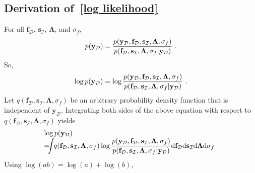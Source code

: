 \documentclass[conference]{IEEEtran}
\begin{document}
	\subsection{Derivation of~\eqref{log likelihood}}
	\label{Derivation of Equation (15)}
	For all $\mathbf{f}_\mathcal{D}$, $\mathbf{s}_\mathcal{I}$, $\mathbf{\Lambda}$, and $\sigma_f$,\vspace{-1.5mm}
	$$
	\vspace{-4.5mm}
	p(\mathbf{y}_\mathcal{D}) =\frac{p(\mathbf{y}_\mathcal{D},\mathbf{f}_\mathcal{D},\mathbf{s}_\mathcal{I},\mathbf{\Lambda},\sigma_f)}{p(\mathbf{f}_\mathcal{D},\mathbf{s}_\mathcal{I},\mathbf{\Lambda},\sigma_f|\mathbf{y}_\mathcal{D})}\ .
	\vspace{-0mm}
	$$
	So,
	$$	
	\vspace{-0mm}	
	\log p(\mathbf{y}_\mathcal{D})=\log \frac{p(\mathbf{y}_\mathcal{D},\mathbf{f}_\mathcal{D},\mathbf{s}_\mathcal{I},\mathbf{\Lambda},\sigma_f)}{p(\mathbf{f}_\mathcal{D},\mathbf{s}_\mathcal{I},\mathbf{\Lambda},\sigma_f|\mathbf{y}_\mathcal{D})}\ .
	\vspace{1mm}
	$$
	Let $q(\mathbf{f}_\mathcal{D},\mathbf{s}_\mathcal{I},\mathbf{\Lambda},\sigma_f)$ be an arbitrary probability density function that is independent of $\mathbf{y}_\mathcal{D}$. Integrating both sides of the above equation with respect to $q(\mathbf{f}_\mathcal{D},\mathbf{s}_\mathcal{I},\mathbf{\Lambda},\sigma_f)$ yields\vspace{-1mm}
	\begin{equation}\vspace{-3mm}
	\hspace{-1.7mm}
	\begin{array}{l}
	\log p(\mathbf{y}_\mathcal{D})\\
	\displaystyle=\hspace{-2mm}\int\hspace{-1mm} q(\mathbf{f}_\mathcal{D},\mathbf{s}_\mathcal{I},\mathbf{\Lambda},\sigma_f)\log \frac{p(\mathbf{y}_\mathcal{D},\mathbf{f}_\mathcal{D},\mathbf{s}_\mathcal{I},\mathbf{\Lambda},\sigma_f)}{p(\mathbf{f}_\mathcal{D},\mathbf{s}_\mathcal{I},\mathbf{\Lambda},\sigma_f|\mathbf{y}_\mathcal{D})} \mathrm{d}\mathbf{f}_\mathcal{D}\mathrm{d}\mathbf{s}_\mathcal{I}\mathrm{d}\mathbf{\Lambda} \mathrm{d}\sigma_f
	\end{array}
	\label{crab}\vspace{0mm}
	\end{equation}
	Using $\log(ab)=\log(a)+\log(b)$, 
\end{document}

